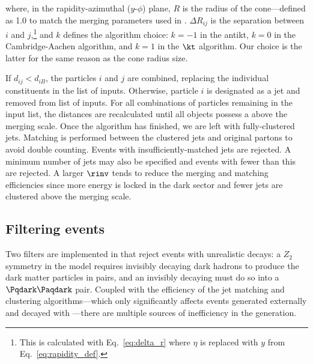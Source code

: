 where, in the rapidity-azimuthal ($y$-$\phi$) plane, $R$ is the radius of the cone---defined as 1.0 to match the merging parameters used in \MADGRAPH. $\Delta R_{ij}$ is the separation between $i$ and $j$,\footnote{This is calculated with Eq.~\ref{eq:delta_r} where $\eta$ is replaced with $y$ from Eq.~\ref{eq:rapidity_def}.} and $k$ defines the algorithm choice: $k = -\text{1}$ in the \gls{antikt}, $k = \text{0}$ in the Cambridge-Aachen algorithm, and $k = \text{1}$ in the $\kt$ algorithm. Our choice is the latter for the same reason as the cone radius size.

If $d_{ij} < d_{iB}$, the particles $i$ and $j$ are combined, replacing the individual constituents in the list of inputs. Otherwise, particle $i$ is designated as a jet and removed from list of inputs. For all combinations of particles remaining in the input list, the distances are recalculated until all objects possess a \pt above the merging scale. Once the algorithm has finished, we are left with fully-clustered \glspl{jet}. Matching is performed between the clustered \glspl{jet} and original partons to avoid double counting. Events with insufficiently-matched \glspl{jet} are rejected. A minimum number of \glspl{jet} may also be specified and events with fewer than this are rejected. A larger $\rinv$ tends to reduce the merging and matching efficiencies since more energy is locked in the dark sector and fewer \glspl{jet} are clustered above the merging scale.





\subsection{Filtering events}
\label{subsec:svj_pythia_filters}

Two filters are implemented in \PYTHIA that reject events with unrealistic decays: a $Z_2$ symmetry in the model requires invisibly decaying dark hadrons to produce the dark matter particles in pairs, and an invisibly decaying \PZprime must do so into a $\Pqdark\Paqdark$ pair. Coupled with the efficiency of the \gls{jet} matching and clustering algorithms---which only significantly affects events generated externally and decayed with \PYTHIA---there are multiple sources of inefficiency in the generation.


